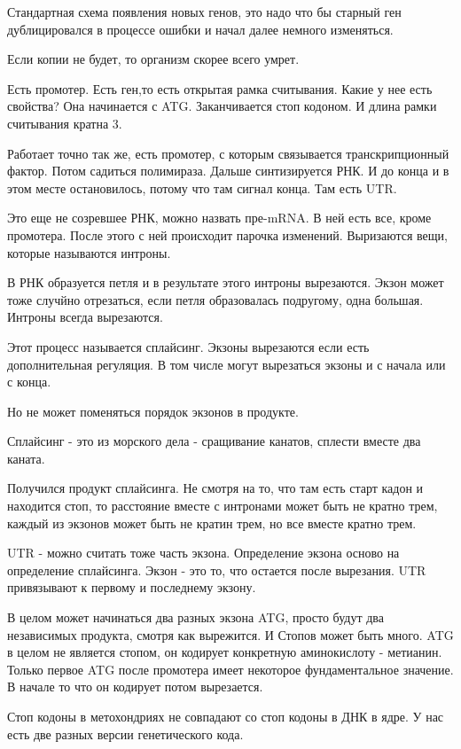 Стандартная схема появления новых генов, это надо что бы старный 
ген дублицировался в процессе ошибки и начал далее немного изменяться. 

Если копии не будет, то организм скорее всего умрет. 

Есть промотер. Есть ген,то есть открытая рамка считывания. 
Какие у нее есть свойства? 
Она начинается с ATG. Заканчивается стоп кодоном. И длина
рамки считывания кратна 3. 

Работает точно так же, 
есть промотер, с которым связывается транскрипционный фактор. 
Потом садиться полимираза. Дальше синтизируется РНК. И до конца и 
в этом месте остановилось, потому что 
там сигнал конца. 
Там есть UTR. 

Это еще не созревшее РНК, можно 
назвать пре-mRNA. В ней есть 
все, кроме промотера. После этого 
с ней происходит парочка изменений. 
Выризаются вещи, которые называются интроны. 

В РНК образуется петля и в результате этого 
интроны вырезаются. Экзон может тоже случйно отрезаться, 
если петля образовалась подругому, 
одна большая. Интроны всегда вырезаются.

Этот процесс называется сплайсинг. Экзоны вырезаются если есть дополнительная регуляция. 
В том числе могут вырезаться экзоны и с начала или с конца. 

Но не может поменяться порядок экзонов в продукте. 

Сплайсинг - это из морского дела - сращивание канатов, сплести вместе два каната. 

Получился продукт сплайсинга. Не смотря на то, что там есть старт кадон и 
находится стоп, то расстояние вместе с интронами может быть не кратно трем, 
каждый из экзонов может быть не кратин трем, но все 
вместе кратно трем. 

UTR - можно считать тоже часть экзона. Определение экзона осново на 
определение сплайсинга. Экзон - это то, что остается после вырезания. 
UTR привязывают к первому и последнему экзону. 

В целом может начинаться два разных экзона ATG, просто 
будут два независимых продукта, смотря как вырежится. И Стопов 
может быть много. ATG в целом не является стопом, он кодирует 
конкретную аминокислоту - метианин. Только первое ATG после промотера имеет 
некоторое фундаментальное значение. В начале то что он кодирует потом вырезается. 

Стоп кодоны в метохондриях не совпадают 
со стоп кодоны в ДНК в ядре. У нас есть 
две разных версии генетического кода. 

